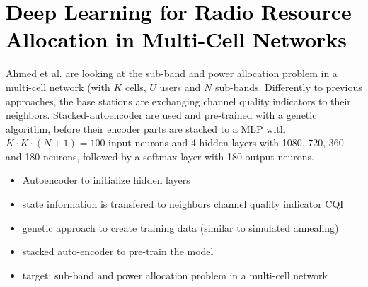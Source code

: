 \section{\textcolor{black}{Deep Learning for Radio Resource Allocation in Multi-Cell Networks\cite{Ahmed2018}}}
Ahmed et al. are looking at the sub-band and power allocation problem in a multi-cell network (with $K$ cells, $U$ users and $N$ sub-bands. Differently to previous approaches, the base stations are exchanging channel quality indicators to their neighbors. Stacked-autoencoder are used and pre-trained with a genetic algorithm, before their encoder parts are stacked to a MLP with $K\cdot K\cdot (N+1)=100$ input neurons and 4 hidden layers with 1080, 720, 360 and 180 neurons, followed by a softmax layer with 180 output neurons. %

\ifdefined\SHOWNOTES
\begin{itemize}
    \item Autoencoder to initialize hidden layers
    \item state information is transfered to neighbors channel quality indicator CQI
    \item genetic approach to create training data (similar to simulated annealing)
    \item stacked auto-encoder to pre-train the model
    \item target: sub-band and power allocation problem in a multi-cell network
\end{itemize}
\fi

